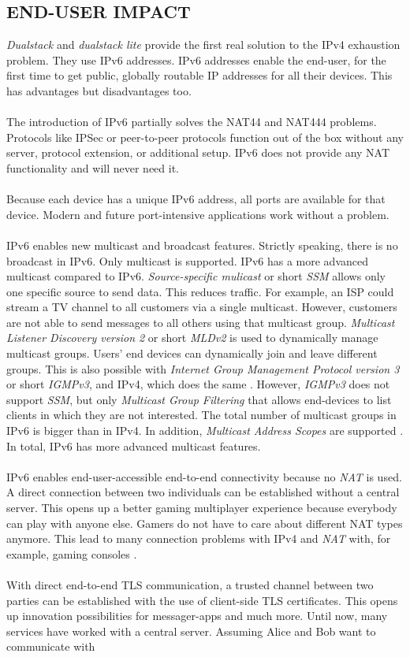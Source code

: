 \documentclass[format=sigconf, natbib=true, nonacm=true]{acmart}
\begin{document}
    \subsection*{END-USER IMPACT}
    \textit{Dualstack} and \textit{dualstack lite} provide the first real solution to the IPv4 exhaustion problem. They use IPv6 addresses. IPv6 addresses enable the end-user, for the first time to get public, globally routable IP addresses for all their devices. This has advantages but disadvantages too.\\\\The introduction of IPv6 partially solves the NAT44 and NAT444 problems. Protocols like IPSec or peer-to-peer protocols function out of the box without any server, protocol extension, or additional setup. IPv6 does not provide any NAT functionality and will never need it.\\\\Because each device has a unique IPv6 address, all ports are available for that device. Modern and future port-intensive applications work without a problem.\\\\IPv6 enables new multicast and broadcast features. Strictly speaking, there is no broadcast in IPv6. Only multicast is supported. IPv6 has a more advanced multicast compared to IPv6. \textit{Source-specific mulicast} or short \textit{SSM} allows only one specific source to send data. This reduces traffic. For example, an ISP could stream a TV channel to all customers via a single multicast. However, customers are not able to send messages to all others using that multicast group. \textit{Multicast Listener Discovery version 2} or short \textit{MLDv2} is used to dynamically manage multicast groups. Users' end devices can dynamically join and leave different groups. This is also possible with \textit{Internet Group Management Protocol version 3} or short \textit{IGMPv3}, and IPv4, which does the same \cite{rfc3376}. However, \textit{IGMPv3} does not support \textit{SSM}, but only \textit{Multicast Group Filtering} that allows end-devices to list clients in which they are not interested. The total number of multicast groups in IPv6 is bigger than in IPv4. In addition, \textit{Multicast Address Scopes} are supported \cite{rfc7346}. In total, IPv6 has more advanced multicast features.\\\\IPv6 enables end-user-accessible end-to-end connectivity because no \textit{NAT} is used. A direct connection between two individuals can be established without a central server. This opens up a better gaming multiplayer experience because everybody can play with anyone else. Gamers do not have to care about different NAT types anymore. This lead to many connection problems with IPv4 and \textit{NAT} with, for example, gaming consoles \cite{XBOXNAT}.\\\\With direct end-to-end TLS communication, a trusted channel between two parties can be established with the use of client-side TLS certificates. This opens up innovation possibilities for messager-apps and much more. Until now, many services have worked with a central server. Assuming Alice and Bob want to communicate with 
\end{document}
